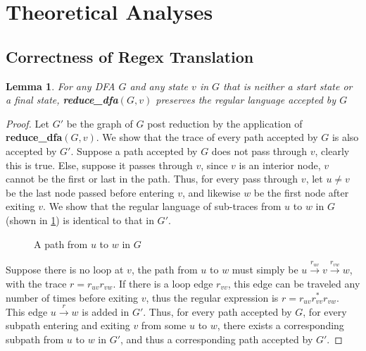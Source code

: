 \documentclass[preprint,12pt]{elsarticle}
\newtheorem{lemma}{Lemma}[section]
\theoremstyle{definition}
\theoremstyle{remark}
\begin{document}
\section{Theoretical Analyses} \label{sec:analysis}
\subsection{Correctness of Regex Translation}
\begin{lemma}
    For any DFA $G$ and any state $v$ in $G$ that is neither a start state or a final state, \textbf{reduce\_dfa}$(G, v)$ preserves the regular language accepted by $G$
\end{lemma}
\begin{proof}
    Let $G'$ be the graph of $G$ post reduction by the application of \textbf{reduce\_dfa}$(G, v)$. We show that the trace of every path accepted by $G$ is also accepted by $G'$. Suppose a path accepted by $G$ does not pass through $v$, clearly this is true. Else, suppose it passes through $v$, since $v$ is an interior node, $v$ cannot be the first or last in the path. Thus, for every pass through $v$, let $u\neq v$ be the last node passed before entering $v$, and likewise $w$ be the first node after exiting $v$. We show that the regular language of sub-traces from $u$ to $w$ in $G$ (shown in \cref{fig:uvw-dfa}) is identical to that in $G'$.
    \begin{figure}[h!]
        \centering
        \caption{A path from $u$ to $w$ in $G$}
        \label{fig:uvw-dfa}
    \end{figure}
    Suppose there is no loop at $v$, the path from $u$ to $w$ must simply be $u\xrightarrow{r_{uv}}v\xrightarrow{r_{vw}}w$, with the trace $r=r_{uv}r_{vw}$. If there is a loop edge $r_{vv}$, this edge can be traveled any number of times before exiting $v$, thus the regular expression is $r=r_{uv}r_{vv}^*r_{vw}$. This edge $u\xrightarrow{r}w$ is added in $G'$. Thus, for every path accepted by $G$, for every subpath entering and exiting $v$ from some $u$ to $w$, there exists a corresponding subpath from $u$ to $w$ in $G'$, and thus a corresponding path accepted by $G'$.
\end{proof}
\end{document}
